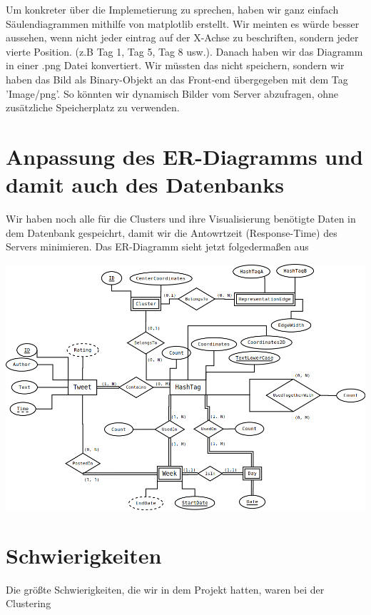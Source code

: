 \begin{enumerate}
Um konkreter über die Implemetierung zu sprechen, haben wir ganz einfach Säulendiagrammen mithilfe von matplotlib erstellt. Wir meinten es würde besser aussehen, wenn nicht jeder eintrag auf der X-Achse zu beschriften, sondern jeder vierte Position. (z.B Tag 1, Tag 5, Tag 8 usw.). Danach haben wir das Diagramm in einer .png Datei konvertiert. Wir müssten das nicht speichern, sondern wir haben das Bild als Binary-Objekt an das Front-end übergegeben mit dem Tag 'Image/png'. So könnten wir dynamisch Bilder vom Server abzufragen, ohne zusätzliche Speicherplatz zu verwenden.


\end{enumerate}

\section*{Anpassung des ER-Diagramms und damit auch des Datenbanks}

Wir haben noch alle für die Clusters und ihre Visualisierung benötigte Daten in dem Datenbank gespeichrt, damit wir die Antowrtzeit (Response-Time) des Servers minimieren. Das ER-Diagramm sieht jetzt folgedermaßen aus

\includegraphics[width=\textwidth]{../ER-Diagramms/ERDiagramm_v2.png}

\section*{Schwierigkeiten}

Die größte Schwierigkeiten, die wir in dem Projekt hatten, waren bei der Clustering

